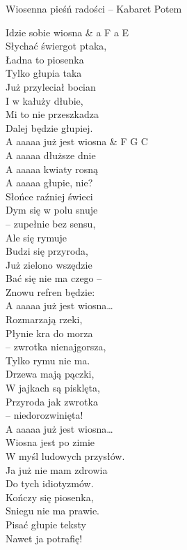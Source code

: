 {\small \begin{piosenka}{Wiosenna pieśń radości -- Kabaret Potem}

Idzie sobie wiosna & a F a E \\
Słychać świergot ptaka, \\
Ładna to piosenka \\
Tylko głupia taka \\[1mm]

Już przyleciał bocian \\
I w kałuży dłubie, \\
Mi to nie przeszkadza \\
Dalej będzie głupiej. \\[1mm]

 A aaaaa już jest wiosna & F G C \\
 A aaaaa dłuższe dnie \\ 
 A aaaaa kwiaty rosną \\
 A aaaaa głupie, nie? \\[1mm]

Słońce raźniej świeci \\
Dym się w polu snuje \\
-- zupełnie bez sensu, \\
Ale się rymuje \\[1mm]

Budzi się przyroda, \\
Już zielono wszędzie \\
Bać się nie ma czego -- \\
Znowu refren będzie: \\[1mm]

 A aaaaa już jest wiosna\ldots \\[1mm]

Rozmarzają rzeki, \\
Płynie kra do morza \\
-- zwrotka nienajgorsza, \\
Tylko rymu nie ma. \\[1mm]

Drzewa mają pączki, \\
W jajkach są pisklęta, \\
Przyroda jak zwrotka \\
-- niedorozwinięta! \\[1mm]

 A aaaaa już jest wiosna\ldots \\[1mm]

Wiosna jest po zimie \\
W myśl ludowych przysłów. \\
Ja już nie mam zdrowia \\
Do tych idiotyzmów. \\[1mm]

Kończy się piosenka, \\
Sniegu nie ma prawie. \\
Pisać głupie teksty \\
Nawet ja potrafię! \\[1mm]

\end{piosenka}  }